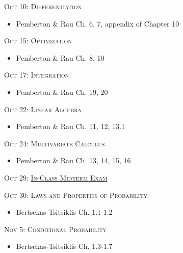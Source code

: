 \documentclass[11pt]{article}
\begin{document}
\noindent \textsc{Oct 10:  Differentiation}

\begin{itemize}
\item Pemberton \& Rau Ch. 6, 7, appendix of Chapter 10

\end{itemize}



\noindent \textsc{Oct 15: Optimization}

\begin{itemize}
\item Pemberton \& Rau Ch. 8, 10

\end{itemize}


\noindent \textsc{Oct 17: Integration}

\begin{itemize}
\item Pemberton \& Rau Ch. 19, 20

\end{itemize}


\noindent \textsc{Oct 22:  Linear Algebra}

\begin{itemize}

\item Pemberton \& Rau Ch. 11, 12, 13.1


\end{itemize}


\noindent \textsc{Oct 24:  Multivariate Calculus}

\begin{itemize}

\item Pemberton \& Rau Ch. 13, 14, 15, 16

\end{itemize}
\noindent \textsc{Oct 29:  \underline{In-Class Midterm Exam}}



\newpage

\noindent \textsc{Oct 30: Laws and Properties of Probability}

\begin{itemize}

\item Bertsekas-Tsitsiklis Ch. 1.1-1.2 


\end{itemize}

\noindent \textsc{Nov 5: Conditional Probability}

\begin{itemize}

\item Bertsekas-Tsitsiklis Ch. 1.3-1.7

\end{itemize}
\end{document}
